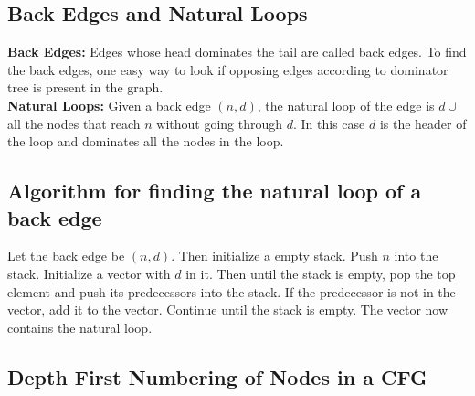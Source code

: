 \documentclass{article}
\begin{document}
\subsection*{Back Edges and Natural Loops}

\textbf{Back Edges: } Edges whose head dominates the tail are called back edges. To find the back edges, one easy way to look if opposing edges according to dominator tree is present in the graph. \\
\textbf{Natural Loops: } Given a back edge $(n,d)$, the natural loop of the edge is $d \cup $ all the nodes that reach $n$ without going through $d$. In this case $d$ is the header of the loop and dominates all the nodes in the loop.

\subsection*{Algorithm for finding the natural loop of a back edge} 
Let the back edge be $(n,d)$. Then initialize a empty stack. Push $n$ into the stack. Initialize a vector with $d$ in it. Then until the stack is empty, pop the top element and push its predecessors into the stack. If the predecessor is not in the vector, add it to the vector. Continue until the stack is empty. The vector now contains the natural loop.

\subsection*{Depth First Numbering of Nodes in a CFG}
\end{document}
